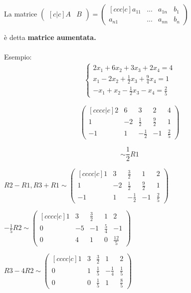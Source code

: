 \documentclass[12pt]{article}
\begin{document}
\begin{center}
La matrice
$\begin{pmatrix}[c|c]
A & B
\end{pmatrix} =
\begin{pmatrix}[ccc|c]
a_{11} & ... & a_{1n} & b_1\\
a_{n1} & ... & a_{nn} & b_n
\end{pmatrix}
$
\end{center}
è detta \textbf{matrice aumentata.}
\\\\
Esempio:
\begin{align*}
  \begin{cases}
    2x_1 + 6x_2 + 3x_3 + 2x_4 = 4\\
    x_1 - 2x_2 + \frac{1}{2}x_3 + \frac{9}{4}x_4 = 1\\
    -x_1 + x_2 - \frac{1}{2}x_3 - x_4 = \frac{2}{5}
  \end{cases}
\end{align*}

\[\begin{pmatrix}[cccc|c]
  2 & 6 & 3 & 2 & 4\\
  1 & -2 & \frac{1}{2} & \frac{9}{2} & 1 \\
  -1 & 1 & -\frac{1}{2} & -1 & \frac{2}{5}
\end{pmatrix}\]

\[\sim \frac{1}{2}R1\]

\begin{center}
$R2 - R1, R3 + R1 \sim
\begin{pmatrix}[cccc|c]
  1 & 3 & \frac{3}{2} & 1 & 2\\
  1 & -2 & \frac{1}{2} & \frac{9}{2} & 1 \\
  -1 & 1 & -\frac{1}{2} & -1 & \frac{2}{5}
\end{pmatrix}$
\end{center}

\begin{center}
$-\frac{1}{5}R2 \sim
\begin{pmatrix}[cccc|c]
  1 & 3 & \frac{3}{2} & 1 & 2\\
  0 & -5 & -1 & \frac{5}{4} & -1 \\
  0 & 4 & 1 & 0 & \frac{12}{5}
\end{pmatrix}$
\end{center}

\begin{center}
$ R3 - 4R2 \sim
\begin{pmatrix}[cccc|c]
  1 & 3 & \frac{3}{2} & 1 & 2\\
  0 & 1 & \frac{1}{5} & -\frac{1}{4} & \frac{1}{5} \\
  0 & 0 & \frac{1}{5} & 1 & \frac{8}{5}
\end{pmatrix}$
\end{center}
\end{document}
